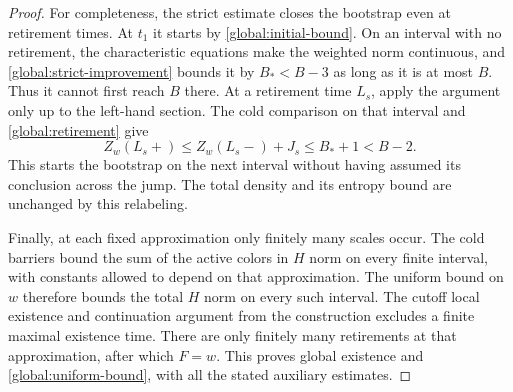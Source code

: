 \begin{proof}
For completeness, the strict estimate closes the bootstrap even at
retirement times.  At $t_1$ it starts by
\eqref{global:initial-bound}.  On an interval with no retirement,
the characteristic equations make the weighted norm continuous, and
\eqref{global:strict-improvement} bounds it by $B_*<B-3$ as long as
it is at most $B$.  Thus it cannot first reach $B$ there.  At a
retirement time $L_s$, apply the argument only up to the left-hand
section.  The cold comparison on that interval and
\eqref{global:retirement} give
\[
 Z_w(L_s+)\le Z_w(L_s-)+J_s\le B_*+1<B-2.
\]
This starts the bootstrap on the next interval without having assumed
its conclusion across the jump.  The total density and its entropy
bound are unchanged by this relabeling.

Finally, at each fixed approximation only finitely many scales occur.
The cold barriers bound the sum of the active colors in $H$ norm on
every finite interval, with constants allowed to depend on that
approximation.  The uniform bound on $w$ therefore bounds the total
$H$ norm on every such interval.  The cutoff local existence and
continuation argument from the construction excludes a finite maximal
existence time.  There are only finitely many retirements at that
approximation, after which $F=w$.  This proves global existence and
\eqref{global:uniform-bound}, with all the stated auxiliary estimates.
\end{proof}
